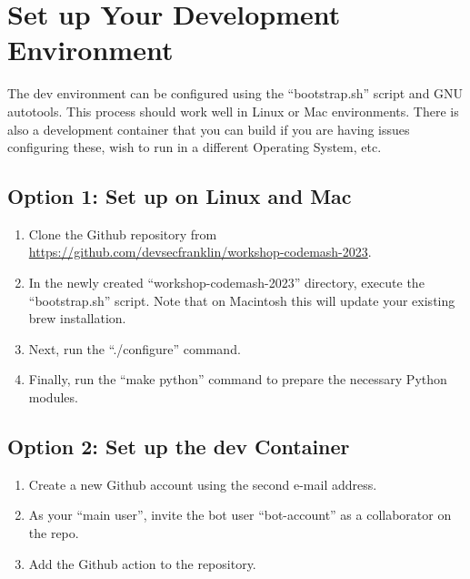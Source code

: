 \section{\label{sec:dev-env}Set up Your Development Environment}

\justifying
The dev environment can be configured using the ``bootstrap.sh'' script and GNU autotools. This process should work well in Linux or Mac environments. There is also a development container that you can build if you are having
issues configuring these, wish to run in a different Operating System, etc.

\subsection{\label{sec:dev-linux}Option 1: Set up on Linux and Mac}

\justifying
\begin{raggedright}
    \begin{enumerate}
        \item Clone the Github repository from \href{https://github.com/devsecfranklin/workshop-codemash-2023}{https://github.com/devsecfranklin/workshop-codemash-2023}.
        \item In the newly created ``workshop-codemash-2023'' directory, execute the ``bootstrap.sh'' script. Note that on Macintosh this will update your existing brew installation.
        \item Next, run the ``./configure'' command.
        \item Finally, run the ``make python'' command to prepare the necessary Python modules.
    \end{enumerate}
\end{raggedright}
\vspace{2mm}

\subsection{\label{sec:dev-container}Option 2: Set up the dev Container}

\justifying
\begin{raggedright}
    \begin{enumerate}
        \item Create a new Github account using the second e-mail address.
        \item As your ``main user'', invite the bot user ``bot-account'' as a collaborator on the repo.
        \item Add the Github action to the repository.
    \end{enumerate}
\end{raggedright}
\vspace{2mm}

